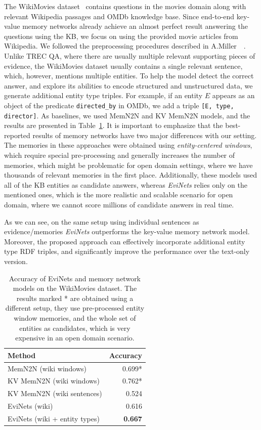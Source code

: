 The WikiMovies dataset~\cite{miller2016key} contains questions in the movies domain along with relevant Wikipedia passages and OMDb knowledge base.
Since end-to-end key-value memory networks already achieve an almost perfect result answering the questions using the KB, we focus on using the provided movie articles from Wikipedia.
We followed the preprocessing procedures described in A.Miller~\etal~\cite{miller2016key}.
Unlike TREC QA, where there are usually multiple relevant supporting pieces of evidence, the WikiMovies dataset usually contains a single relevant sentence, which, however, mentions multiple entities.
To help the model detect the correct answer, and explore its abilities to encode structured and unstructured data, we generate additional entity type triples.
For example, if an entity $E$ appears as an object of the predicate \texttt{directed\_by} in OMDb, we add a triple \texttt{[E, type, director]}.
As baselines, we used MemN2N and KV MemN2N models, and the results are presented in Table~\ref{section:factoid:evinet:eval:wikimovies}.
It is important to emphasize that the best-reported results of memory networks have two major differences with our setting.
The memories in these approaches were obtained using \textit{entity-centered windows}, which require special pre-processing and generally increases the number of memories, which might be problematic for open domain settings, where we have thousands of relevant memories in the first place.
Additionally, these models used all of the KB entities as candidate answers, whereas \textit{EviNets} relies only on the mentioned ones, which is the more realistic and scalable scenario for open domain, where we cannot score millions of candidate answers in real time.

As we can see, on the same setup using individual sentences as evidence/memories \textit{EviNets} outperforms the key-value memory network model.
Moreover, the proposed approach can effectively incorporate additional entity type RDF triples, and significantly improve the performance over the text-only version.

\begin{table}
\centering
\begin{tabular}{p{6cm}r}
Method & Accuracy \\
\hline
MemN2N (wiki windows) & 0.699* \\
KV MemN2N (wiki windows) & 0.762* \\
\hline
KV MemN2N (wiki sentences) & 0.524 \\
EviNets (wiki) & 0.616  \\
EviNets (wiki + entity types) & \textbf{0.667} \\
\end{tabular}
\caption{Accuracy of EviNets and memory network models on the WikiMovies dataset. The results marked * are obtained using a different setup, \ie they use pre-processed entity window memories, and the whole set of entities as candidates, which is very expensive in an open domain scenario.}
\label{section:factoid:evinet:eval:wikimovies}
\end{table}

